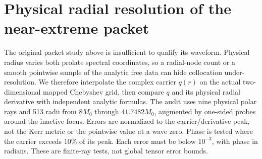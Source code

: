 \documentclass[aps,prd,preprint,notitlepage,nofootinbib]{revtex4-2}
\begin{document}
\section{Physical radial resolution of the near-extreme packet}
The original packet study above is insufficient to qualify its waveform.
Physical radius varies both prolate spectral coordinates, so a radial-node
count or a smooth pointwise sample of the analytic free data can hide
collocation under-resolution. We therefore interpolate the complex carrier
$q(r)$ on the actual two-dimensional mapped Chebyshev grid, then compare
$q$ and its physical radial derivative with independent analytic formulas.
The audit uses nine physical polar rays and 513 radii from $8M_0$ through
$41.7482M_0$, augmented by one-sided probes around the inactive focus.
Errors are normalized to the carrier/derivative peak, not the Kerr metric
or the pointwise value at a wave zero. Phase is tested where the carrier
exceeds 10\% of its peak. Each error must be below $10^{-3}$, with phase
in radians. These are finite-ray tests, not global tensor error bounds.
\end{document}
